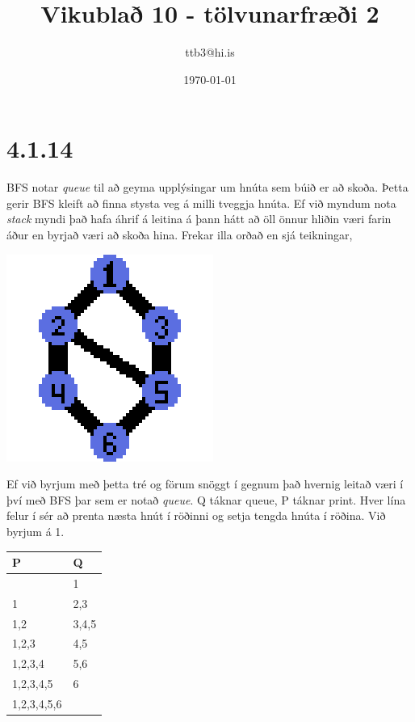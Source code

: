 \documentclass{article}
\title{Vikublað 10 - tölvunarfræði 2}
\author{ttb3@hi.is}
\date{\today}
\begin{document}
\maketitle


\section*{4.1.14}
BFS notar \emph{queue} til að geyma upplýsingar um hnúta sem búið er að skoða.
Þetta gerir BFS kleift að finna stysta veg á milli tveggja hnúta.
Ef við myndum nota \emph{stack} myndi það hafa áhrif á leitina á þann hátt að öll önnur hliðin væri farin áður en byrjað væri að skoða hina.
Frekar illa orðað en sjá teikningar,
\begin{center}
    \includegraphics{graph.png}
\end{center}
Ef við byrjum með þetta tré og förum snöggt í gegnum það hvernig leitað væri í því með BFS þar sem er notað \emph{queue}.
Q táknar queue, P táknar print. Hver lína felur í sér að prenta næsta hnút í röðinni og setja tengda hnúta í röðina. Við byrjum á 1.\\
\begin{center}
    \begin{tabular}{|l|l|}
        \hline
        P&Q\\
        \hline
                    &1\\
                    \hline
        1           &2,3\\
        \hline
        1,2         &3,4,5\\
        \hline
        1,2,3       &4,5\\
        \hline
        1,2,3,4     &5,6\\
        \hline
        1,2,3,4,5   &6\\
        \hline
        1,2,3,4,5,6 &\\
        \hline
    \end{tabular}
\end{center}
\end{document}
